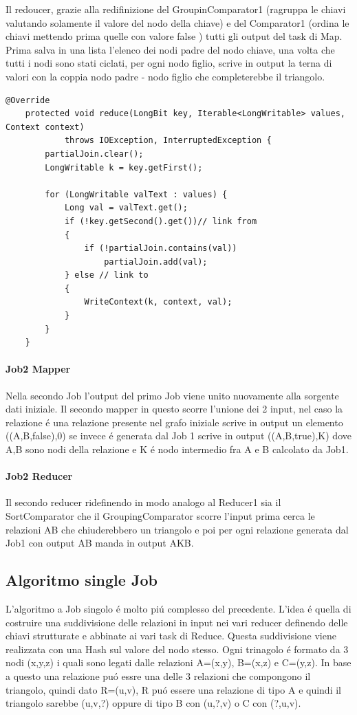 \documentclass[paper=a4, fontsize=11pt]{scrartcl}	%
\numberwithin{equation}{section}															%
\numberwithin{figure}{section}																%
\numberwithin{table}{section}																%
\begin{document}
Il redoucer, grazie alla redifinizione del GroupinComparator1 (ragruppa le chiavi valutando solamente il valore del nodo della chiave) e  del Comparator1 (ordina le chiavi mettendo prima quelle con valore false ) tutti gli output del task di Map. Prima salva in una lista l'elenco dei nodi padre del nodo chiave, una volta che tutti i nodi sono stati ciclati, per ogni nodo figlio, scrive in output la terna di valori con la coppia nodo padre - nodo figlio che completerebbe il triangolo.
\begin{lstlisting}[label=Reducer1,caption=Implementazione del Reducer1]	
	@Override
	protected void reduce(LongBit key, Iterable<LongWritable> values, Context context)
			throws IOException, InterruptedException {
		partialJoin.clear();
		LongWritable k = key.getFirst();

		for (LongWritable valText : values) {
			Long val = valText.get();
			if (!key.getSecond().get())// link from
			{
				if (!partialJoin.contains(val))
					partialJoin.add(val);
			} else // link to
			{
				WriteContext(k, context, val);
			}
		}
	}
\end{lstlisting}
\paragraph{Job2 Mapper}
Nella secondo Job l'output del primo Job viene unito nuovamente alla sorgente dati iniziale. Il secondo mapper in questo scorre l'unione dei 2 input, nel caso la relazione \'e una relazione presente nel grafo iniziale scrive in output un elemento ((A,B,false),0) se invece \'e generata dal Job 1 scrive in output  ((A,B,true),K) dove A,B sono nodi della relazione e K \'e nodo intermedio fra A e B calcolato da Job1.
\paragraph{Job2 Reducer}
Il secondo reducer ridefinendo in modo analogo al Reducer1 sia il SortComparator che il GroupingComparator scorre l'input prima cerca le relazioni AB che chiuderebbero un triangolo e poi per ogni relazione generata dal Job1 con output AB manda in output AKB.

\subsection{Algoritmo single Job}
L'algoritmo a Job singolo \'e molto pi\'u complesso del precedente.
L'idea \'e quella di costruire una suddivisione delle relazioni in input nei vari reducer definendo delle chiavi strutturate e abbinate ai vari task di Reduce. Questa suddivisione viene realizzata con una Hash sul valore del nodo stesso.
Ogni trinagolo \'e formato da  3 nodi (x,y,z) i quali sono legati dalle relazioni A=(x,y), B=(x,z) e C=(y,z). In base a questo una relazione pu\'o essre una delle 3 relazioni che compongono il triangolo, quindi dato R=(u,v), R pu\'o essere una relazione di tipo A e quindi  il triangolo sarebbe (u,v,?) oppure di tipo B con (u,?,v) o C con (?,u,v).
\end{document}

